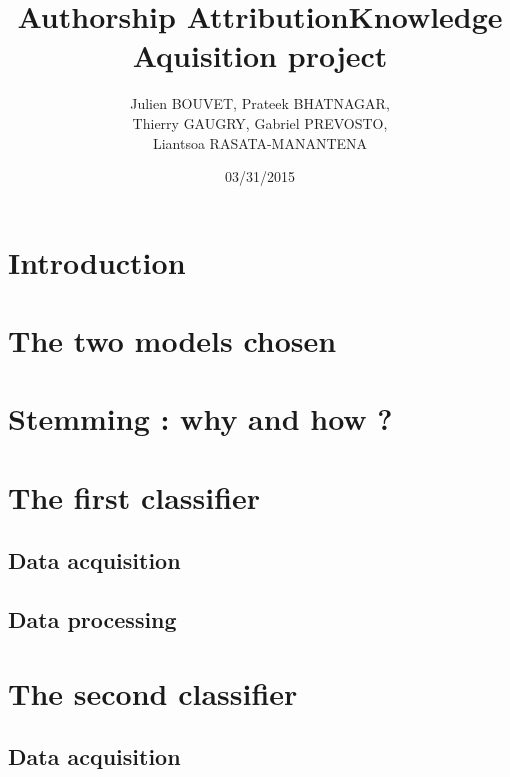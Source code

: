 \documentclass[12pt]{article}
\title{Authorship Attribution\smallbreak Knowledge Aquisition project}
\author{Julien \textsc{BOUVET}, Prateek \textsc{BHATNAGAR}, \\
	Thierry \textsc{GAUGRY}, Gabriel \textsc{PREVOSTO}, \\
	Liantsoa \textsc{RASATA-MANANTENA}}
\date{03/31/2015}
\begin{document}
\maketitle

\newpage
\tableofcontents
\newpage

\section{Introduction}					\label{sec:introduction}			

\section{The two models chosen}			\label{sec:models}				

\section{Stemming : why and how ?}			\label{sec:stemming}			

\section{The first classifier}				\label{sec:classifier1}
\subsection{Data acquisition}				\label{sec:data1}				
\subsection{Data processing}				\label{sec:processing1}			

\section{The second classifier}				\label{sec:classifier2}
\subsection{Data acquisition}				\label{sec:data2}				
\end{document}
